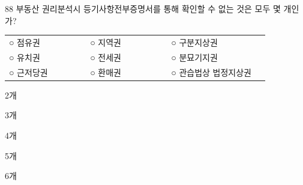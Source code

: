 \begin{question}{88}
부동산 권리분석시 등기사항전부증명서를 통해 확인할 수 없는 것은 모두 몇 개인가?
\begin{framedtext}
\begin{tabular}{@{}p{0.29\linewidth}p{0.29\linewidth}p{0.34\linewidth}@{}}
○ 점유권 & ○ 지역권 & ○ 구분지상권 \\
○ 유치권 & ○ 전세권 & ○ 분묘기지권 \\
○ 근저당권 & ○ 환매권 & ○ 관습법상 법정지상권
\end{tabular}
\end{framedtext}
\begin{choices}
  \item 2개
  \item 3개
  \item 4개
  \item 5개
  \item 6개
\end{choices}
\end{question}
